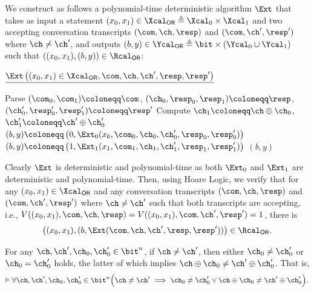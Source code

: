 \begin{answer}
    We construct as follows a polynomial-time deterministic algorithm $\Ext$ that takes as input a statement $(x_0, x_1)\in\Xcal_\mathsf{OR}\triangleq \Xcal_0\times \Xcal_1$ and two accepting conversation transcripts $(\com, \ch, \resp)$ and $(\com, \ch', \resp')$ where $\ch\neq \ch'$, and outputs $(b,y)\in\Ycal_\mathsf{OR}\triangleq \bit\times (\Ycal_0\cup \Ycal_1)$ such that $((x_0, x_1),(b, y))\in \Rcal_\mathsf{OR}$:
    \begin{simplebox}
        \small
        \noindent
        $\underline{\Ext\left((x_0, x_1) \in\Xcal_\mathsf{OR}, \com, \ch, \ch', \resp, \resp'\right)}$
        \begin{algorithmic}[1]
            \State Parse $(\com_0, \com_1) \coloneqq \com$, $(\ch_0, \resp_0, \resp_1)\coloneqq \resp$, $(\ch_0', \resp_0', \resp_1')\coloneqq \resp'$
            \State Compute $\ch_1\coloneqq \ch\oplus \ch_0$, $\ch_1'\coloneqq \ch'\oplus \ch_0'$
                \State $(b, y)\coloneqq \left( 0, \Ext_0(x_0, \com_0, \ch_0, \ch_0', \resp_0, \resp_0') \right)$
            \Else 
                \State $(b, y)\coloneqq \left( 1,  \Ext_1(x_1, \com_1, \ch_1, \ch_1', \resp_1, \resp_1') \right)$
            \EndIf
            \State\Return $(b,y)$
        \end{algorithmic}
    \end{simplebox}
    Clearly $\Ext$ is deterministic and polynomial-time as both $\Ext_0$ and $\Ext_1$ are deterministic and polynomial-time. Then, using Hoare Logic, we verify that for any $(x_0, x_1)\in\Xcal_\mathsf{OR}$ and any conversation transcripts $(\com, \ch, \resp)$ and $(\com, \ch', \resp')$ where $\ch\neq \ch'$ such that both transcripts are accepting, i.e., $V((x_0, x_1), \com, \ch, \resp)=V((x_0, x_1), \com, \ch', \resp')=1$, there is 
    \[
        \left((x_0, x_1), (b, \Ext(\com, \ch, \ch', \resp, \resp'))\right) \in \Rcal_\mathsf{OR}.
    \]

    \begin{observation}\label{obs:p5-2-1}
        For any $\ch,\ch', \ch_0,\ch_0' \in \bit^n$, if $\ch\neq \ch'$, then either $\ch_0\neq \ch_0'$ or $\ch_0=\ch_0'$ holds, the latter of which implies $\ch\oplus \ch_0\neq \ch'\oplus \ch_0'$.
         That is,
         \[
            \vDash \forall  \ch,\ch', \ch_0,\ch_0' \in \bit^n\Bigl( \ch\neq \ch' \implies \ch_0\neq \ch_0' \lor \ch\oplus \ch_0\neq \ch'\oplus \ch_0' \Bigr).
         \]
    \end{observation}
    

\end{answer}
